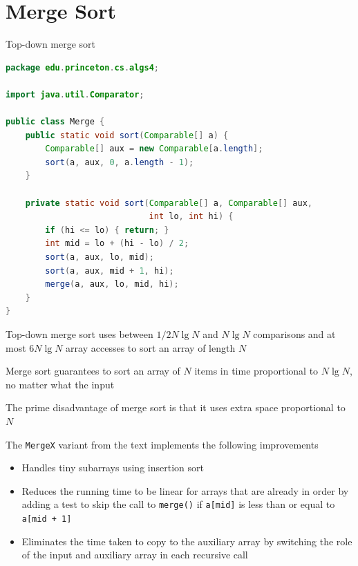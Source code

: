 \documentclass[8pt,a4paper,compress]{beamer}
\begin{document}
\section{Merge Sort}
\begin{frame}[fragile]
\pause

Top-down merge sort

\begin{lstlisting}[language=Java]
package edu.princeton.cs.algs4;

import java.util.Comparator;

public class Merge {
    public static void sort(Comparable[] a) {
        Comparable[] aux = new Comparable[a.length]; 
        sort(a, aux, 0, a.length - 1);
    }
    
    private static void sort(Comparable[] a, Comparable[] aux, 
                             int lo, int hi) {
        if (hi <= lo) { return; }
        int mid = lo + (hi - lo) / 2;
        sort(a, aux, lo, mid); 
        sort(a, aux, mid + 1, hi); 
        merge(a, aux, lo, mid, hi);
    }
}
\end{lstlisting}
\end{frame}

\begin{frame}[fragile]
\pause

Trace of merge sort
\begin{center}
}
\end{center}
\end{frame}

\begin{frame}[fragile]
\pause

Top-down merge sort uses between $1/2N\lg N$ and $N\lg N$ comparisons and at most $6N\lg N$ array accesses to sort an array of length $N$

\pause
\bigskip

Merge sort guarantees to sort an array of $N$ items in time proportional to $N \lg N$, no matter what the input

\pause
\bigskip

The prime disadvantage of merge sort is that it uses extra space proportional to $N$

\pause
\bigskip

The \lstinline{MergeX} variant from the text implements the following improvements

\begin{itemize}
\item Handles tiny subarrays using insertion sort
\item Reduces the running time to be linear for arrays that are already in order by adding a test to skip the call to \lstinline$merge()$ if \lstinline$a[mid]$ is less than or equal to \lstinline$a[mid + 1]$
\item Eliminates the time taken to copy to the auxiliary array by switching the role of the input and auxiliary array in each recursive call
\end{itemize}
\end{frame}
\end{document}
